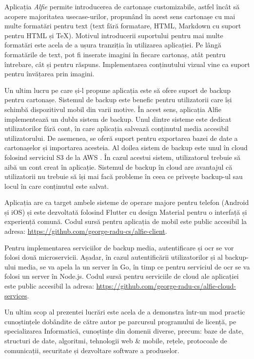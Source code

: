 Aplicația \textit{Alfie} permite introducerea de cartonașe customizabile, astfel încât să acopere majoritatea usecase-urilor, propunând în acest sens cartonașe cu mai multe formatări pentru text (text fără formatare, HTML, Markdown cu suport pentru HTML și TeX). Motivul introducerii suportului pentru mai multe formatări este acela de a ușura tranziția în utilizarea aplicației. Pe lângă formatările de text, pot fi inserate imagini în fiecare cartonaș, atât pentru întrebare, cât și pentru răspuns. Implementarea conținutului vizual vine ca suport pentru învățarea prin imagini.

Un ultim lucru pe care și-l propune aplicația este să ofere suport de backup pentru cartonașe. Sistemul de backup este benefic pentru utilizatorii care își schimbă dispozitivul mobil din varii motive. În acest sens, aplicația Alfie implementează un dublu sistem de backup. Unul dintre sisteme este dedicat utilizatorilor fără cont, în care aplicația salvează conținutul media accesibil utilizatorului. De asemenea, se oferă suport pentru exportarea bazei de date a cartonașelor și importarea acesteia. Al doilea sistem de backup este unul în cloud folosind serviciul S3 de la AWS \cite{awsS3}. În cazul acestui sistem, utilizatorul trebuie să aibă un cont creat în aplicație. Sistemul de backup în cloud are avantajul că utilizatorii nu trebuie să își mai facă probleme în ceea ce privește backup-ul sau locul în care conținutul este salvat.

Aplicația are ca target ambele sisteme de operare majore pentru telefon (Android și iOS) și este dezvoltată folosind Flutter cu design Material pentru o interfață și experiență comună. Codul sursă pentru aplicația de mobil este public accesibil la adresa: \url{https://github.com/george-radu-cs/alfie-client}.

Pentru implementarea serviciilor de backup media, autentificare și ocr se vor folosi două microservicii. Așadar, în cazul autentificării utilizatorilor și al backup-ului media, se va apela la un server în Go, în timp ce pentru serviciul de ocr se va folosi un server în Node.js. Codul sursă pentru serviciile de cloud ale aplicației este public accesibil la adresa: \url{https://github.com/george-radu-cs/alfie-cloud-services}.

Un ultim scop al prezentei lucrări este acela de a demonstra într-un mod practic cunoștințele dobândite de către autor pe parcursul programului de licență, pe specializarea Informatică, cunoștințe din domenii diverse, precum: baze de date, structuri de date, algoritmi, tehnologii web \& mobile, rețele, protocoale de comunicații, securitate și dezvoltare software a produselor.

